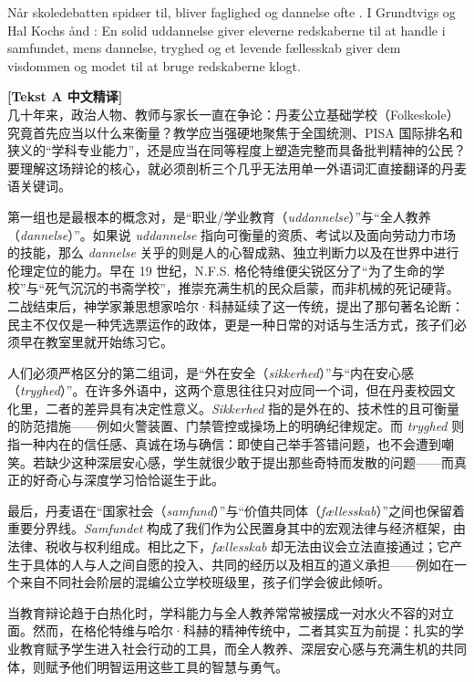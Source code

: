 Når skoledebatten spidser til, bliver faglighed og dannelse ofte . I Grundtvigs og Hal Kochs ånd : En solid uddannelse giver eleverne redskaberne til at handle i samfundet, mens dannelse, tryghed og et levende fællesskab giver dem visdommen og modet til at bruge redskaberne klogt.

\begin{transbox}
\small
\textbf{\color{NCDTeal}[Tekst A 中文精译]}\\
几十年来，政治人物、教师与家长一直在争论：丹麦公立基础学校（Folkeskole）究竟首先应当以什么来衡量？教学应当强硬地聚焦于全国统测、PISA 国际排名和狭义的“学科专业能力”，还是应当在同等程度上塑造完整而具备批判精神的公民？要理解这场辩论的核心，就必须剖析三个几乎无法用单一外语词汇直接翻译的丹麦语关键词。

第一组也是最根本的概念对，是“职业/学业教育（\textit{uddannelse}）”与“全人教养（\textit{dannelse}）”。如果说 \textit{uddannelse} 指向可衡量的资质、考试以及面向劳动力市场的技能，那么 \textit{dannelse} 关乎的则是人的心智成熟、独立判断力以及在世界中进行伦理定位的能力。早在 19 世纪，N.F.S. 格伦特维便尖锐区分了“为了生命的学校”与“死气沉沉的书斋学校”，推崇充满生机的民众启蒙，而非机械的死记硬背。二战结束后，神学家兼思想家哈尔·科赫延续了这一传统，提出了那句著名论断：民主不仅仅是一种凭选票运作的政体，更是一种日常的对话与生活方式，孩子们必须早在教室里就开始练习它。

人们必须严格区分的第二组词，是“外在安全（\textit{sikkerhed}）”与“内在安心感（\textit{tryghed}）”。在许多外语中，这两个意思往往只对应同一个词，但在丹麦校园文化里，二者的差异具有决定性意义。\textit{Sikkerhed} 指的是外在的、技术性的且可衡量的防范措施——例如火警装置、门禁管控或操场上的明确纪律规定。而 \textit{tryghed} 则指一种内在的信任感、真诚在场与确信：即使自己举手答错问题，也不会遭到嘲笑。若缺少这种深层安心感，学生就很少敢于提出那些奇特而发散的问题——而真正的好奇心与深度学习恰恰诞生于此。

最后，丹麦语在“国家社会（\textit{samfund}）”与“价值共同体（\textit{fællesskab}）”之间也保留着重要分界线。\textit{Samfundet} 构成了我们作为公民置身其中的宏观法律与经济框架，由法律、税收与权利组成。相比之下，\textit{fællesskab} 却无法由议会立法直接通过；它产生于具体的人与人之间自愿的投入、共同的经历以及相互的道义承担——例如在一个来自不同社会阶层的混编公立学校班级里，孩子们学会彼此倾听。

当教育辩论趋于白热化时，学科能力与全人教养常常被摆成一对水火不容的对立面。然而，在格伦特维与哈尔·科赫的精神传统中，二者其实互为前提：扎实的学业教育赋予学生进入社会行动的工具，而全人教养、深层安心感与充满生机的共同体，则赋予他们明智运用这些工具的智慧与勇气。
\end{transbox}


